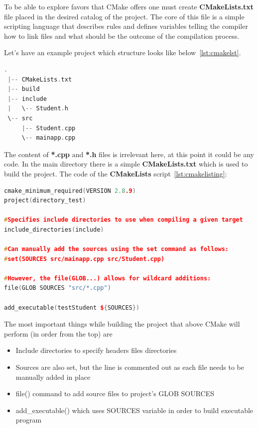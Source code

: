 \documentclass[a4paper,12pt]{book}
\begin{document}
{{\bigskip
To be able to explore favors that CMake offers one must create \textbf{CMakeLists.txt} file placed in the desired catalog of the project. The core of this file is a simple scripting language that describes rules and defines variables telling the compiler how to link files and what should be the outcome of the compilation process.

\bigskip
Let's have an example project\cite{cmakeintroduction} which structure looks like below~\ref{lst:cmakelst}.\newline
\begin{lstlisting}[frame=single,label={lst:cmakelst},language=C++, caption={Example CMake project structure.}, captionpos=b]
 .
 |-- CMakeLists.txt
 |-- build
 |-- include
 |   \-- Student.h
 \-- src
     |-- Student.cpp
     \-- mainapp.cpp
\end{lstlisting}

\bigskip
The content of \textbf{*.cpp} and \textbf{*.h} files is irrelevant here, at this point it could be any code. In the main directory there is a simple \textbf{CMakeLists.txt} which is used to build the project. The code of the \textbf{CMakeLists} script~\ref{lst:cmakelisting}:\newline

\begin{lstlisting}[frame=single,label={lst:cmakelisting}, language=C++, caption={CMakeLists.txt of example project.}, captionpos=b]
cmake_minimum_required(VERSION 2.8.9)
project(directory_test)

#Specifies include directories to use when compiling a given target
include_directories(include)

#Can manually add the sources using the set command as follows:
#set(SOURCES src/mainapp.cpp src/Student.cpp)

#However, the file(GLOB...) allows for wildcard additions:
file(GLOB SOURCES "src/*.cpp")

add_executable(testStudent ${SOURCES})
\end{lstlisting}
\bigskip
The most important things while building the project that above CMake will perform (in order from the top) are
\begin{itemize}
	\item Include directories to specify headers files directories
	\item Sources are also set, but the line is commented out as each file needs to be manually added in place
	\item file() command to add source files to project's GLOB SOURCES
	\item add\_executable() which uses SOURCES variable in order to build executable program
\end{itemize}


}}
\end{document}
